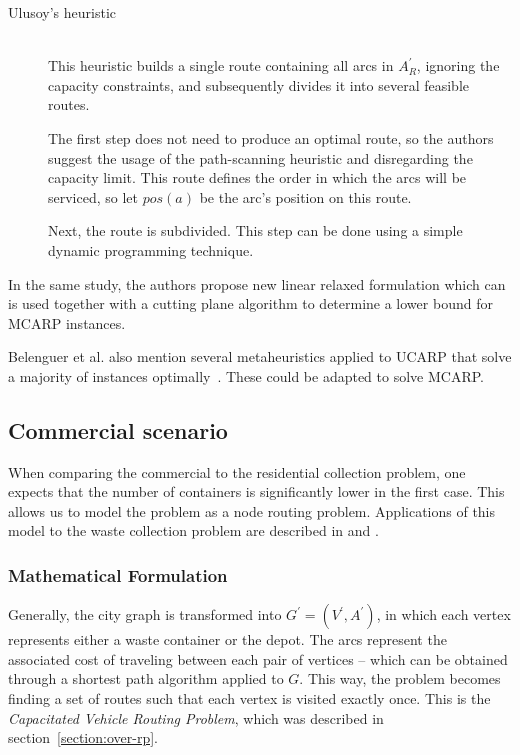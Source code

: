 \begin{description}
\item[Ulusoy's heuristic] \hfill \\
This heuristic builds a single route containing all arcs in $A_R^\prime$,
ignoring the capacity constraints, and subsequently divides it into several
feasible routes.

The first step does not need to produce an optimal route, so the authors
suggest the usage of the path-scanning heuristic and disregarding the capacity
limit. This route defines the order in which the arcs will be serviced, so let
$pos(a)$ be the arc's position on this route.

Next, the route is subdivided. This step can be done using a simple dynamic
programming technique.
\end{description}

In the same study, the authors propose new linear relaxed formulation which can
is used together with a cutting plane algorithm to determine a lower bound for
MCARP instances. 

Belenguer et al. also mention several metaheuristics applied to UCARP that
solve a majority of instances optimally~\citep{Belenguer06,Belenguer03}. These
could be adapted to solve MCARP.





\subsection{Commercial scenario}
\label{section:commercial}

When comparing the commercial to the residential collection problem, one expects
that the number of containers is significantly lower in the first case. This
allows us to model the problem as a node routing problem. Applications of this
model to the waste collection problem are described in \citet{Tung2000} and
\citet{Kim06}.

\subsubsection{Mathematical Formulation}

Generally, the city graph is transformed into $G^\prime = (V^\prime,
A^\prime)$, in which each vertex represents either a waste container or the
depot.  The arcs represent the associated cost of traveling between each pair
of vertices -- which can be obtained through a shortest path algorithm applied
to $G$. This way, the problem becomes finding a set of routes such that each
vertex is visited exactly once. This is the \textit{Capacitated Vehicle Routing
Problem}, which was described in section~\ref{section:over-rp}.

